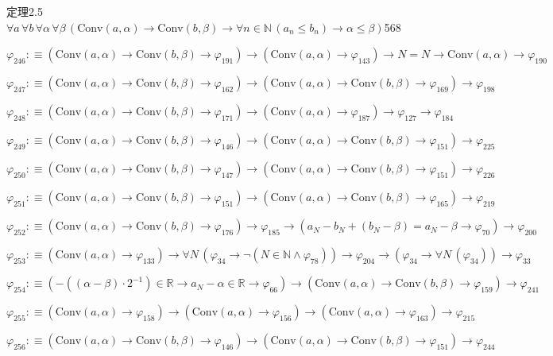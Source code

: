 \begin{fullproof}{定理2.5}{$\forall a\,\forall b\,\forall \alpha\,\forall \beta\,(\mathrm{Conv}(a,\alpha) \to \mathrm{Conv}(b,\beta) \to \forall n \in \mathbb{N}\,(a_{n} \leq b_{n}) \to \alpha \leq \beta)$}{568}
\begin{abbrevlist}
\item $\varphi_{246} :\equiv (\mathrm{Conv}(a,\alpha) \to \mathrm{Conv}(b,\beta) \to \varphi_{191}) \to (\mathrm{Conv}(a,\alpha) \to \varphi_{143}) \to N = N \to \mathrm{Conv}(a,\alpha) \to \varphi_{190}$
\item $\varphi_{247} :\equiv (\mathrm{Conv}(a,\alpha) \to \mathrm{Conv}(b,\beta) \to \varphi_{162}) \to (\mathrm{Conv}(a,\alpha) \to \mathrm{Conv}(b,\beta) \to \varphi_{169}) \to \varphi_{198}$
\item $\varphi_{248} :\equiv (\mathrm{Conv}(a,\alpha) \to \mathrm{Conv}(b,\beta) \to \varphi_{171}) \to (\mathrm{Conv}(a,\alpha) \to \varphi_{187}) \to \varphi_{127} \to \varphi_{184}$
\item $\varphi_{249} :\equiv (\mathrm{Conv}(a,\alpha) \to \mathrm{Conv}(b,\beta) \to \varphi_{146}) \to (\mathrm{Conv}(a,\alpha) \to \mathrm{Conv}(b,\beta) \to \varphi_{151}) \to \varphi_{225}$
\item $\varphi_{250} :\equiv (\mathrm{Conv}(a,\alpha) \to \mathrm{Conv}(b,\beta) \to \varphi_{147}) \to (\mathrm{Conv}(a,\alpha) \to \mathrm{Conv}(b,\beta) \to \varphi_{151}) \to \varphi_{226}$
\item $\varphi_{251} :\equiv (\mathrm{Conv}(a,\alpha) \to \mathrm{Conv}(b,\beta) \to \varphi_{151}) \to (\mathrm{Conv}(a,\alpha) \to \mathrm{Conv}(b,\beta) \to \varphi_{165}) \to \varphi_{219}$
\item $\varphi_{252} :\equiv (\mathrm{Conv}(a,\alpha) \to \mathrm{Conv}(b,\beta) \to \varphi_{176}) \to \varphi_{185} \to (a_{N} - b_{N} + (b_{N} - \beta) = a_{N} - \beta \to \varphi_{70}) \to \varphi_{200}$
\item $\varphi_{253} :\equiv (\mathrm{Conv}(a,\alpha) \to \varphi_{133}) \to \forall N\,(\varphi_{34} \to \neg (N \in \mathbb{N} \land \varphi_{78})) \to \varphi_{204} \to (\varphi_{34} \to \forall N\,(\varphi_{34})) \to \varphi_{33}$
\item $\varphi_{254} :\equiv (-((\alpha - \beta) \cdot 2^{-1}) \in \mathbb{R} \to a_{N} - \alpha \in \mathbb{R} \to \varphi_{66}) \to (\mathrm{Conv}(a,\alpha) \to \mathrm{Conv}(b,\beta) \to \varphi_{159}) \to \varphi_{241}$
\item $\varphi_{255} :\equiv (\mathrm{Conv}(a,\alpha) \to \varphi_{158}) \to (\mathrm{Conv}(a,\alpha) \to \varphi_{156}) \to (\mathrm{Conv}(a,\alpha) \to \varphi_{163}) \to \varphi_{215}$
\item $\varphi_{256} :\equiv (\mathrm{Conv}(a,\alpha) \to \mathrm{Conv}(b,\beta) \to \varphi_{146}) \to (\mathrm{Conv}(a,\alpha) \to \mathrm{Conv}(b,\beta) \to \varphi_{151}) \to \varphi_{244}$

\end{abbrevlist}
\end{fullproof}
